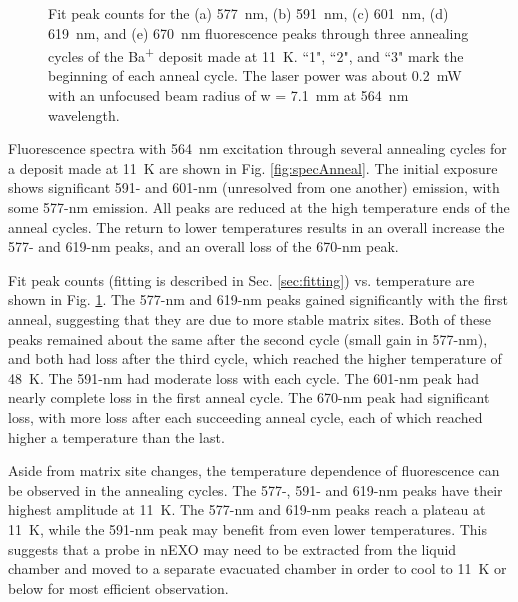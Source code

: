 \begin{figure}
                \caption{Fit peak counts for the (a) 577~nm, (b) 591~nm, (c) 601~nm, (d) 619~nm, and (e) 670~nm fluorescence peaks through three annealing cycles of the Ba\textsuperscript{+} deposit made at 11~K.  ``1", ``2", and ``3" mark the beginning of each anneal cycle.  The laser power was about 0.2~mW with an unfocused beam radius of w = 7.1~mm at 564~nm wavelength.}
\label{fig:annealGrn}
\end{figure}

Fluorescence spectra with 564~nm excitation through several annealing cycles for a deposit made at 11~K are shown in Fig. \ref{fig:specAnneal}.  The initial exposure shows significant 591- and 601-nm (unresolved from one another) emission, with some 577-nm emission.  All peaks are reduced at the high temperature ends of the anneal cycles.  The return to lower temperatures results in an overall increase the 577- and 619-nm peaks, and an overall loss of the 670-nm peak.  

Fit peak counts (fitting is described in Sec. \ref{sec:fitting}) vs. temperature are shown in Fig. \ref{fig:annealGrn}.  The 577-nm and 619-nm peaks gained significantly with the first anneal, suggesting that they are due to more stable matrix sites.  Both of these peaks remained about the same after the second cycle (small gain in 577-nm), and both had loss after the third cycle, which reached the higher temperature of 48~K.  The 591-nm had moderate loss with each cycle.  The 601-nm peak had nearly complete loss in the first anneal cycle.  The 670-nm peak had significant loss, with more loss after each succeeding anneal cycle, each of which reached higher a temperature than the last.




Aside from matrix site changes, the temperature dependence of fluorescence can be observed in the annealing cycles.  The 577-, 591- and 619-nm peaks have their highest amplitude at 11~K.  The 577-nm and 619-nm peaks reach a plateau at 11~K, while the 591-nm peak may benefit from even lower temperatures.  This suggests that a probe in nEXO may need to be extracted from the liquid chamber and moved to a separate evacuated chamber in order to cool to 11~K or below for most efficient observation.  

